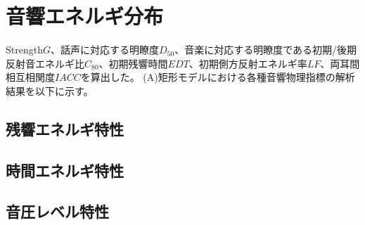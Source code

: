 \chapter{音響エネルギ分布}
Strength$G$、話声に対応する明瞭度$D_{50}$、音楽に対応する明瞭度である初期/後期反射音エネルギ比$C_{80}$、初期残響時間$EDT$、初期側方反射エネルギ率$LF$、両耳間相互相関度$IACC$を算出した。
(A)矩形モデルにおける各種音響物理指標の解析結果を以下に示す。


\section{残響エネルギ特性}
\section{時間エネルギ特性}
\section{音圧レベル特性}
